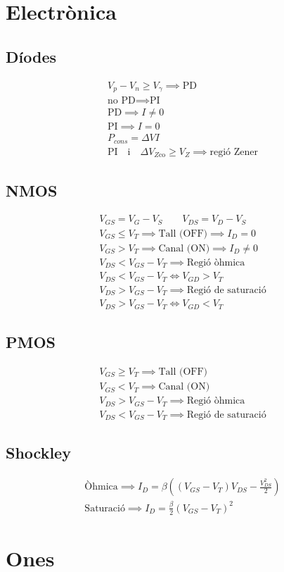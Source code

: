 \documentclass[10pt,twocolumn]{article}
\begin{document}
\section{Electrònica}
\subsection{Díodes}
\begin{gather*}
V_p - V_n \geq V_\gamma \implies \text{PD} \\
\text{no PD} \implies \text{PI} \\
\text{PD} \implies I \neq 0 \\
\text{PI} \implies I = 0 \\
P_{cons} = \Delta V I \\
\text{PI} \quad \text{i} \quad \Delta V_{Z \text{co}} \geq V_Z \implies \text{regió Zener}
\end{gather*}
\subsection{NMOS}
\begin{gather*}
V_{GS} = V_G - V_S \qquad V_{DS} = V_D - V_S \\
V_{GS} \leq V_T \implies \text{Tall (OFF)} \implies I_D = 0 \\
V_{GS} > V_T \implies \text{Canal (ON)} \implies I_D \neq 0  \\
V_{DS} < V_{GS} - V_T \implies \text{Regió òhmica} \\
V_{DS} < V_{GS} - V_T \iff V_{GD} > V_T \\
V_{DS} > V_{GS} - V_T \implies \text{Regió de saturació} \\
V_{DS} > V_{GS} - V_T \iff V_{GD} < V_T
\end{gather*}
\subsection{PMOS}
\begin{gather*}
    V_{GS} \geq V_T \implies \text{Tall (OFF)} \\
    V_{GS} < V_T \implies \text{Canal (ON)} \\
    V_{DS} > V_{GS} - V_T \implies \text{Regió òhmica} \\
    V_{DS} < V_{GS} - V_T \implies \text{Regió de saturació}
\end{gather*}
\subsection{Shockley}
\begin{gather*}
    \text{Òhmica} \implies I_D = \beta \left(\left(V_{GS} - V_T\right)V_{DS} - \frac{V_{DS}^{2}}{2}\right) \\
    \text{Saturació} \implies I_D = \frac{\beta}{2} \left(V_{GS} - V_T\right)^2
\end{gather*}
\section{Ones}
\end{document}
